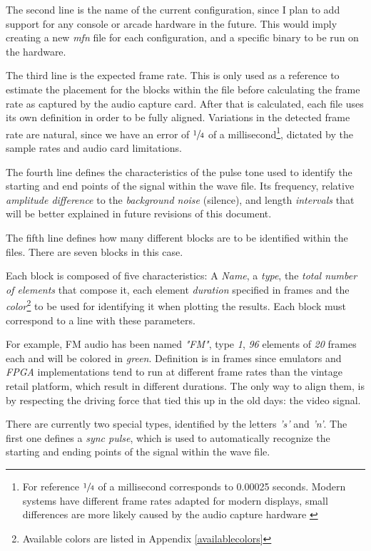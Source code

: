 \documentclass[10pt,a4paper]{report}
\begin{document}
\begin{appendices}
The second line is the name of the current configuration, since I plan to add support for any console or arcade hardware in the future. This would imply creating a new \textit{mfn} file for each configuration, and a specific binary to be run on the hardware.

The third line is the expected frame rate. This is only used as a reference to estimate the placement for the blocks within the file before calculating the frame rate as captured by the audio capture card. After that is calculated, each file uses its own definition in order to be fully aligned. Variations in the detected frame rate are natural, since we have an error of $\sfrac{1}{4}$ of a millisecond\footnote{For reference $\sfrac{1}{4}$ of a millisecond corresponds to 0.00025 seconds. Modern systems have different frame rates adapted for modern displays, small differences are more likely caused by the audio capture hardware \cite{SoundCardClock}}, dictated by the sample rates and audio card limitations.

The fourth line defines the characteristics of the pulse tone used to identify the starting and end points of the signal within the wave file. Its frequency, relative \textit{amplitude difference} to the \textit{background noise} (silence), and length \textit{intervals} that will be better explained in future revisions of this document.

The fifth line defines how many different blocks are to be identified within the files. There are seven blocks in this case.

Each block is composed of five characteristics: A \textit{Name}, a \textit{type}, the \textit{total number of elements} that compose it, each element \textit{duration} specified in frames and the \textit{color}\footnote{Available colors are listed in Appendix \ref{availablecolors}} to be used for identifying it when plotting the results. Each block must correspond to a line with these parameters.

For example, FM audio has been named \textit{"FM"}, type \textit{1}, \textit{96} elements of \textit{20} frames each and will be colored in \textit{green}. Definition is in frames since emulators and \textit{FPGA} implementations tend to run at different frame rates than the vintage retail platform, which result in different durations. The only way to align them, is by respecting the driving force that tied this up in the old days: the video signal.

There are currently two special types, identified by the letters \textit{'s'} and \textit{'n'}. The first one defines a \textit{sync pulse}, which is used to automatically recognize the starting and ending points of the signal within the wave file. 


\end{appendices}
\end{document}

